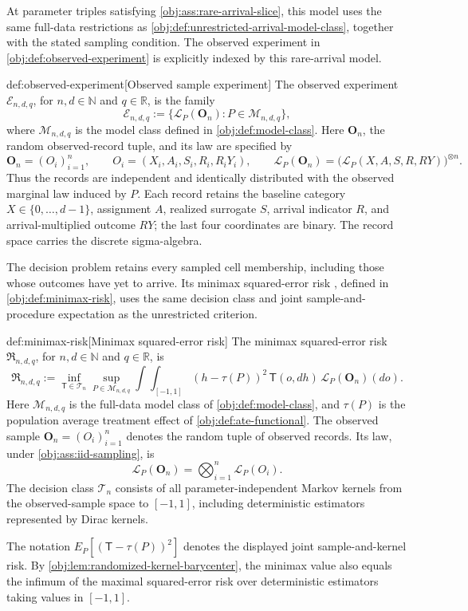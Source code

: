 \documentclass[11pt]{article}
\begin{document}
At parameter triples satisfying \cref{obj:ass:rare-arrival-slice}, this model uses the same full-data restrictions as \cref{obj:def:unrestricted-arrival-model-class}, together with the stated sampling condition. The observed experiment  in \cref{obj:def:observed-experiment} is explicitly indexed by this rare-arrival model.

\begin{definitionv}{def:observed-experiment}[Observed sample experiment]
The observed experiment \(\mathcal E_{n,d,q}\), for \(n,d\in\mathbb N\) and \(q\in\mathbb R\), is the family
\[
\mathcal E_{n,d,q}
:=
\bigl\{\mathcal L_P(\mathbf O_n):P\in\mathcal M_{n,d,q}\bigr\},
\]
where \(\mathcal M_{n,d,q}\) is the model class defined in \cref{obj:def:model-class}. Here \(\mathbf O_n\), the random observed-record tuple, and its law are specified by
\[
\mathbf O_n=(O_i)_{i=1}^{n},
\qquad
O_i=(X_i,A_i,S_i,R_i,R_iY_i),
\qquad
\mathcal L_P(\mathbf O_n)
=
\bigl(\mathcal L_P(X,A,S,R,RY)\bigr)^{\otimes n}.
\]
Thus the records are independent and identically distributed with the observed marginal law induced by \(P\). Each record retains the baseline category \(X\in\{0,\ldots,d-1\}\), assignment \(A\), realized surrogate \(S\), arrival indicator \(R\), and arrival-multiplied outcome \(RY\); the last four coordinates are binary. The record space carries the discrete sigma-algebra.
\end{definitionv}

The decision problem retains every sampled cell membership, including those whose outcomes have yet to arrive. Its minimax squared-error risk , defined in \cref{obj:def:minimax-risk}, uses the same decision class and joint sample-and-procedure expectation as the unrestricted criterion.

\begin{definitionv}{def:minimax-risk}[Minimax squared-error risk]
The minimax squared-error risk \(\mathfrak R_{n,d,q}\), for \(n,d\in\mathbb N\) and \(q\in\mathbb R\), is
\[
\mathfrak R_{n,d,q}
:=
\inf_{\mathsf T\in\mathcal T_n}
\sup_{P\in\mathcal M_{n,d,q}}
\int\!\int_{[-1,1]}
(h-\tau(P))^2\,
\mathsf T(o,dh)\,
\mathcal L_P(\mathbf O_n)(do).
\]
Here \(\mathcal M_{n,d,q}\) is the full-data model class of \cref{obj:def:model-class}, and \(\tau(P)\) is the population average treatment effect of \cref{obj:def:ate-functional}. The observed sample \(\mathbf O_n=(O_i)_{i=1}^n\) denotes the random tuple of observed records. Its law, under \cref{obj:ass:iid-sampling}, is
\[
\mathcal L_P(\mathbf O_n)
=
\bigotimes_{i=1}^{n}\mathcal L_P(O_i).
\]
The decision class \(\mathcal T_n\) consists of all parameter-independent Markov kernels from the observed-sample space to \([-1,1]\), including deterministic estimators represented by Dirac kernels.

The notation \(E_P[(\mathsf T-\tau(P))^2]\) denotes the displayed joint sample-and-kernel risk. By \cref{obj:lem:randomized-kernel-barycenter}, the minimax value also equals the infimum of the maximal squared-error risk over deterministic estimators taking values in \([-1,1]\).
\end{definitionv}
\end{document}
